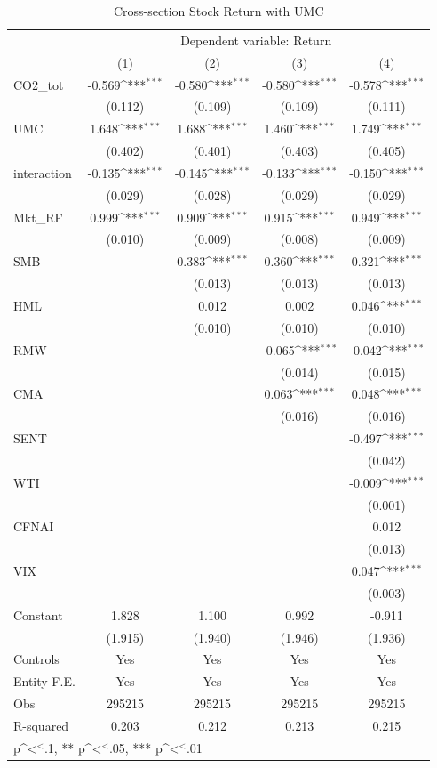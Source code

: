 \documentclass[12pt]{article}
\begin{document}
\begin{table}[H]
\centering
\footnotesize
\caption{Cross-section Stock Return with UMC}
\label{tab: firm_umc}
{
\def\sym#1{\ifmmode^{#1}\else\(^{#1}\)\fi}
\begin{tabular}{@{\extracolsep{2pt}}l*{4}{c}@{}}
\toprule

& \multicolumn{4}{c}{Dependent variable: Return} \\
\cline{2-5}
 & (1) & (2) & (3) & (4) \\
\hline
CO2\_tot & -0.569\sym{***} & -0.580\sym{***} & -0.580\sym{***} & -0.578\sym{***} \\
 & (0.112) & (0.109) & (0.109) & (0.111) \\
UMC & 1.648\sym{***} & 1.688\sym{***} & 1.460\sym{***} & 1.749\sym{***} \\
 & (0.402) & (0.401) & (0.403) & (0.405) \\
interaction & -0.135\sym{***} & -0.145\sym{***} & -0.133\sym{***} & -0.150\sym{***} \\
 & (0.029) & (0.028) & (0.029) & (0.029) \\
Mkt\_RF & 0.999\sym{***} & 0.909\sym{***} & 0.915\sym{***} & 0.949\sym{***} \\
 & (0.010) & (0.009) & (0.008) & (0.009) \\
SMB &  & 0.383\sym{***} & 0.360\sym{***} & 0.321\sym{***} \\
 &  & (0.013) & (0.013) & (0.013) \\
HML &  & 0.012 & 0.002 & 0.046\sym{***} \\
 &  & (0.010) & (0.010) & (0.010) \\
RMW &  &  & -0.065\sym{***} & -0.042\sym{***} \\
 &  &  & (0.014) & (0.015) \\
CMA &  &  & 0.063\sym{***} & 0.048\sym{***} \\
 &  &  & (0.016) & (0.016) \\
SENT &  &  &  & -0.497\sym{***} \\
 &  &  &  & (0.042) \\
WTI &  &  &  & -0.009\sym{***} \\
 &  &  &  & (0.001) \\
CFNAI &  &  &  & 0.012 \\
 &  &  &  & (0.013) \\
VIX &  &  &  & 0.047\sym{***} \\
 &  &  &  & (0.003) \\
Constant & 1.828 & 1.100 & 0.992 & -0.911 \\
 & (1.915) & (1.940) & (1.946) & (1.936) \\

\hline
Controls & Yes & Yes & Yes & Yes \\
Entity F.E. & Yes & Yes & Yes & Yes \\
Obs & 295215 & 295215 & 295215 & 295215 \\
R-squared & 0.203 & 0.212 & 0.213 & 0.215 \\
\bottomrule
\multicolumn{5}{l}{\footnotesize * p\sym{<}.1, ** p\sym{<}.05, *** p\sym{<}.01}
\end{tabular}
}
\end{table}
\end{document}
